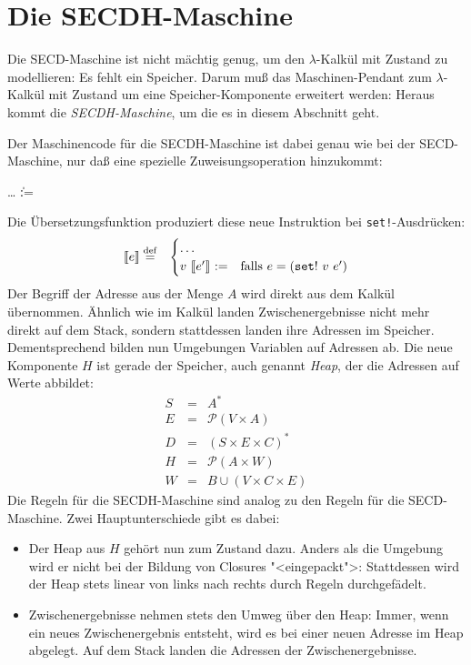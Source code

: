 \section{Die SECDH-Maschine}

Die SECD-Maschine ist nicht mächtig genug, um den $\lambda$-Kalkül mit
Zustand zu modellieren: Es fehlt ein Speicher.  Darum muß das
Maschinen-Pendant zum $\lambda$-Kalkül mit Zustand um eine
Speicher-Komponente erweitert werden: Heraus kommt die
\textit{SECDH-Maschine}, um die es in diesem Abschnitt geht.

Der Maschinencode für die SECDH-Maschine ist dabei genau wie bei der
SECD-Maschine, nur daß eine spezielle Zuweisungsoperation hinzukommt:
%
\begin{grammar}
   \: \ldots
  \> \| :=
\end{grammar}
%
Die Übersetzungsfunktion produziert diese neue Instruktion bei
\texttt{set!}-Ausdrücken:
%
\begin{eqnarray*}
  \llbracket e \rrbracket &\stackrel{\rm def}{=}&
  \begin{cases}
    \ldots\\
    v~\llbracket e'\rrbracket~\mathtt{:=}
    & \textrm{falls $e = (\mathtt{set!}~v~e')$}
  \end{cases}
\end{eqnarray*}  
%
Der Begriff der Adresse aus der Menge $A$ wird direkt aus dem Kalkül
übernommen.  Ähnlich wie im Kalkül landen Zwischenergebnisse nicht
mehr direkt auf dem Stack, sondern stattdessen landen ihre Adressen im
Speicher.  Dementsprechend bilden nun Umgebungen Variablen auf
Adressen ab.  Die neue Komponente $H$ ist gerade der Speicher, auch
genannt \textit{Heap}, der die Adressen auf Werte
abbildet:
%
\begin{eqnarray*}
  S &=& A^{\ast}\\
  E &=& \mathcal{P}(V\times A)\\
  D &=& (S\times E\times C)^{\ast}\\
  H &=& \mathcal{P}(A\times W)\\
  W &=& B \cup (V\times C\times E)
\end{eqnarray*}
%
Die Regeln für die SECDH-Maschine sind analog zu den Regeln für die
SECD-Maschine.  Zwei Hauptunterschiede gibt es dabei:
%
\begin{itemize}
\item Der Heap aus $H$ gehört nun zum Zustand dazu.  Anders als die
  Umgebung wird er nicht bei der Bildung von Closures "<eingepackt">:
  Stattdessen wird der Heap stets linear von links nach rechts durch
  Regeln durchgefädelt.
\item Zwischenergebnisse nehmen stets den Umweg über den Heap: Immer,
  wenn ein neues Zwischenergebnis entsteht, wird es bei einer neuen
  Adresse im Heap abgelegt. Auf dem Stack landen die
  Adressen der Zwischenergebnisse.
\end{itemize}

